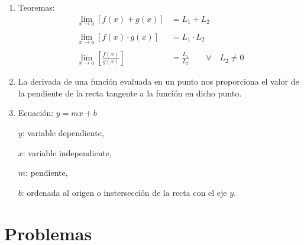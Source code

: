 \documentclass[]{article}
\begin{document}
\begin{enumerate}
\item Teoremas:
\begin{align}
\lim_{x \to a} [f(x) + g(x)]     &=  L_{1} + L_{2}  \\ \nonumber \\
\lim_{x \to a} [f(x) \cdot g(x)] &= L_{1} \cdot L_{2} \\ \nonumber \\
\lim_{x \to a} \left[\frac{f(x)}{g(x)}\right] &= \frac{L_{1}}{L_{2}} \qquad 
\forall \quad L_{2} \neq 0
\end{align}
\setcounter{equation}{0}

\item La derivada de una funci\'on evaluada en un punto nos proporciona el valor
de la pendiente de la recta tangente a la funci\'on en dicho punto.


\item Ecuaci\'on: $y = mx + b$

$y$: variable dependiente,

$x$: variable independiente,

$m$: pendiente,

$b$: ordenada al origen o instersecci\'on de la recta con el eje $y$.
\end{enumerate}
\newpage

\section*{Problemas} %
\label{sec:problemas2}
\end{document}
